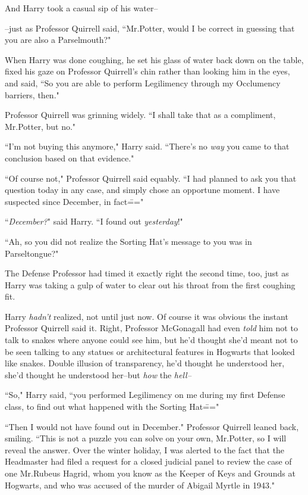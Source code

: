 And Harry took a casual sip of his water\---

\---just as Professor Quirrell said, ``Mr.\?Potter, would I be correct in guessing that you are also a Parselmouth?"

When Harry was done coughing, he set his glass of water back down on the table, fixed his gaze on Professor Quirrell's chin rather than looking him in the eyes, and said, ``So you are able to perform Legilimency through my Occlumency barriers, then."

Professor Quirrell was grinning widely. ``I shall take that as a compliment, Mr.\?Potter, but no."

``I'm not buying this anymore," Harry said. ``There's no \emph{way} you came to that conclusion based on that evidence."

``Of course not," Professor Quirrell said equably. ``I had planned to ask you that question today in any case, and simply chose an opportune moment. I have suspected since December, in fact\==="

``\emph{December?}" said Harry. ``I found out \emph{yesterday}!"

``Ah, so you did not realize the Sorting Hat's message to you was in Parseltongue?"

The Defense Professor had timed it exactly right the second time, too, just as Harry was taking a gulp of water to clear out his throat from the first coughing fit.

Harry \emph{hadn't} realized, not until just now. Of course it was obvious the instant Professor Quirrell said it. Right, Professor McGonagall had even \emph{told} him not to talk to snakes where anyone could see him, but he'd thought she'd meant not to be seen talking to any statues or architectural features in Hogwarts that looked like snakes. Double illusion of transparency, he'd thought he understood her, she'd thought he understood her\---but \emph{how} the \emph{hell\---}

``So," Harry said, ``you performed Legilimency on me during my first Defense class, to find out what happened with the Sorting Hat\==="

``Then I would not have found out in December." Professor Quirrell leaned back, smiling. ``This is not a puzzle you can solve on your own, Mr.\?Potter, so I will reveal the answer. Over the winter holiday, I was alerted to the fact that the Headmaster had filed a request for a closed judicial panel to review the case of one Mr.\?Rubeus Hagrid, whom you know as the Keeper of Keys and Grounds at Hogwarts, and who was accused of the murder of Abigail Myrtle in 1943."

